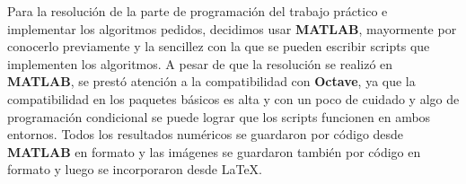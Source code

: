 Para la resolución de la parte de programación del trabajo práctico e implementar los algoritmos pedidos, decidimos usar \textbf{MATLAB}, mayormente por conocerlo previamente y la sencillez con la que se pueden escribir scripts que implementen los algoritmos. A pesar de que la resolución se realizó en \textbf{MATLAB}, se prestó atención a la compatibilidad con \textbf{Octave}, ya que la compatibilidad en los paquetes básicos es alta y con un poco de cuidado y algo de programación condicional se puede lograr que los scripts funcionen en ambos entornos.
Todos los resultados numéricos se guardaron por código desde \textbf{MATLAB} en formato \textbf{} y las imágenes se guardaron también por código en formato \textbf{} y luego se incorporaron desde \LaTeX. 


